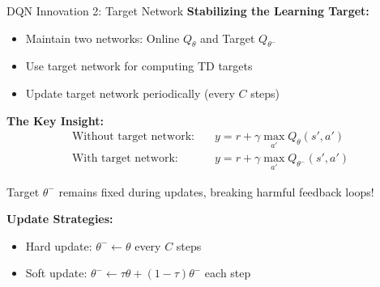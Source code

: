 \documentclass[aspectratio=169,10pt]{beamer}
\begin{document}
\begin{frame}{DQN Innovation 2: Target Network}
\textbf{Stabilizing the Learning Target:}
\begin{itemize}
    \item Maintain two networks: Online $Q_\theta$ and Target $Q_{\theta^-}$
    \item Use target network for computing TD targets
    \item Update target network periodically (every $C$ steps)
\end{itemize}

\vspace{0.3cm}
\textbf{The Key Insight:}
\begin{align}
\text{Without target network:} & \quad y = r + \gamma \max_{a'} Q_\theta(s', a') \\
\text{With target network:} & \quad y = r + \gamma \max_{a'} Q_{\theta^-}(s', a')
\end{align}

Target $\theta^-$ remains fixed during updates, breaking harmful feedback loops!

\vspace{0.3cm}
\textbf{Update Strategies:}
\begin{itemize}
    \item Hard update: $\theta^- \leftarrow \theta$ every $C$ steps
    \item Soft update: $\theta^- \leftarrow \tau\theta + (1-\tau)\theta^-$ each step
\end{itemize}

\end{frame}
\end{document}
